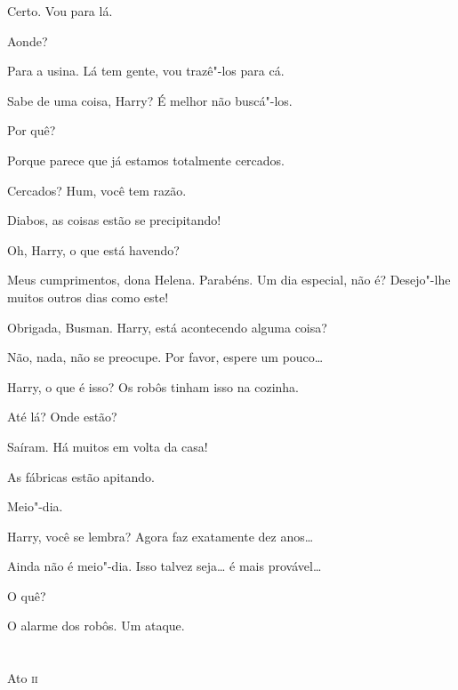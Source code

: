  Certo.  Vou para lá.

 Aonde?

 Para a usina. Lá tem gente, vou trazê"-los para cá.

 Sabe de uma coisa, Harry? É melhor não \mbox{buscá"-los}.

 Por quê?

 Porque parece que já estamos totalmente \mbox{cercados}.

 Cercados?  Hum, você tem razão.

 Diabos, as coisas estão se precipitando! 

 Oh, Harry, o que está havendo?

  Meus cumprimentos, dona Helena. Parabéns. Um dia
especial, não é? Desejo"-lhe muitos outros dias como este!

 Obrigada, Busman. Harry, está acontecendo alguma coisa?

 Não, nada, não se preocupe. Por favor, espere um pouco\ldots{}

 Harry, o que é isso?  Os robôs tinham isso na cozinha.

 Até lá? Onde estão?

 Saíram. Há muitos em volta da casa!

 As fábricas estão apitando.

 Meio"-dia.

 Harry, você se lembra? Agora faz exatamente dez anos\ldots{}

  Ainda não é meio"-dia. Isso talvez seja\ldots{} é mais
provável\ldots{}

 O quê?

 O alarme dos robôs. Um ataque.




\chapter[Ato \textsc{ii}]{}
\begin{center}
\mdseries\huge Ato \textsc{ii}
\end{center}
\medskip

